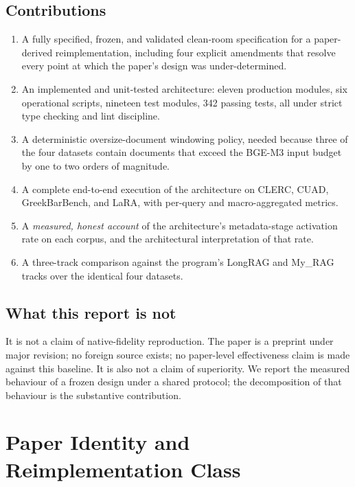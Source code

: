 \documentclass[11pt,a4paper]{article}
\begin{document}
\subsection{Contributions}
\begin{enumerate}[leftmargin=1.5em,itemsep=0.15em]
  \item A fully specified, frozen, and validated clean-room
    specification for a paper-derived reimplementation, including
    four explicit amendments that resolve every point at which the
    paper's design was under-determined.
  \item An implemented and unit-tested architecture: eleven
    production modules, six operational scripts, nineteen test
    modules, \num{342} passing tests, all under strict type checking
    and lint discipline.
  \item A deterministic oversize-document windowing policy, needed
    because three of the four datasets contain documents that exceed
    the BGE-M3 input budget by one to two orders of magnitude.
  \item A complete end-to-end execution of the architecture on
    CLERC, CUAD, GreekBarBench, and LaRA, with per-query and
    macro-aggregated metrics.
  \item A \emph{measured, honest account} of the architecture's
    metadata-stage activation rate on each corpus, and the
    architectural interpretation of that rate.
  \item A three-track comparison against the program's LongRAG and
    My\_RAG tracks over the identical four datasets.
\end{enumerate}

\subsection{What this report is not}
It is not a claim of native-fidelity reproduction. The paper is a
preprint under major revision; no foreign source exists; no
paper-level effectiveness claim is made against this baseline. It is
also not a claim of superiority. We report the measured behaviour of
a frozen design under a shared protocol; the decomposition of that
behaviour is the substantive contribution.

\section{Paper Identity and Reimplementation Class}\label{sec:identity}
\end{document}
